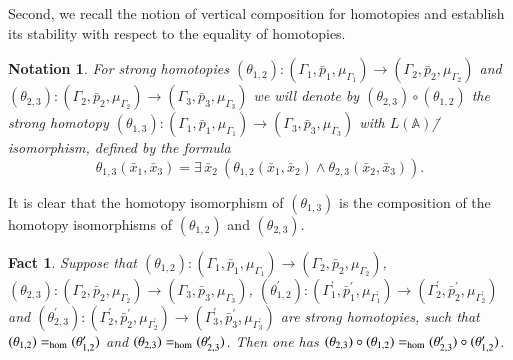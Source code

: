 \documentclass[12pt]{article}
\newtheorem{fact}{Fact}
\newtheorem{notation}{Notation}
\theoremstyle{definition}
\def\MA{{\mathbb{A}}}
\begin{document}
Second, we recall the notion of vertical composition for homotopies and establish its stability with respect to the equality of homotopies.

\begin{notation}
For strong homotopies $(\theta_{1,2})\colon (\Gamma_1,\bar p_1,\mu_{\Gamma_1})\to (\Gamma_2,\bar p_2,\mu_{\Gamma_2})$ and $(\theta_{2,3})\colon (\Gamma_2,\bar p_2,\mu_{\Gamma_2})\to (\Gamma_3,\bar p_3,\mu_{\Gamma_3})$ we will denote by $(\theta_{2,3})\circ(\theta_{1,2})$ the strong homotopy $(\theta_{1,3})\colon(\Gamma_1,\bar p_1,\mu_{\Gamma_1})\to (\Gamma_3,\bar p_3,\mu_{\Gamma_3})$  with $L(\MA)$\=/isomorphism, defined by the formula 
\begin{equation}\label{eq:theta}
       \theta_{1,3}(\bar x_1,\bar x_3)=\exists \,\bar x_2\:(\theta_{1,2}(\bar x_1,\bar x_2)\wedge \theta_{2,3}(\bar x_2,\bar x_3)). 
    \end{equation}
\end{notation}

It is clear that the homotopy isomorphism of $(\theta_{1,3})$ is the composition of the homotopy isomorphisms of $(\theta_{1,2})$ and $(\theta_{2,3})$.

\begin{fact}\label{fact:hat6}
Suppose that $(\theta_{1,2})\colon (\Gamma_1,\bar p_1,\mu_{\Gamma_1})\to (\Gamma_2,\bar p_2,\mu_{\Gamma_2})$,  $(\theta_{2,3})\colon (\Gamma_2,\bar p_2,\mu_{\Gamma_2})\to (\Gamma_3,\bar p_3,\mu_{\Gamma_3})$, $(\theta^\prime_{1,2})\colon (\Gamma^\prime_1,\bar p^\prime_1,\mu_{\Gamma^\prime_1})\to (\Gamma^\prime_2,\bar p^\prime_2,\mu_{\Gamma^\prime_2})$ and   $(\theta^\prime_{2,3})\colon (\Gamma^\prime_2,\bar p^\prime_2,\mu_{\Gamma^\prime_2})\to (\Gamma^\prime_3,\bar p^\prime_3,\mu_{\Gamma^\prime_3})$ are strong homotopies, such that $(\theta_{1,2})=_{\rm hom}(\theta^\prime_{1,2})$ and $(\theta_{2,3})=_{\rm hom}(\theta^\prime_{2,3})$. Then one has $(\theta_{2,3})\circ(\theta_{1,2})=_{\rm hom}(\theta^\prime_{2,3})\circ(\theta^\prime_{1,2})$.
\end{fact}
\end{document}
